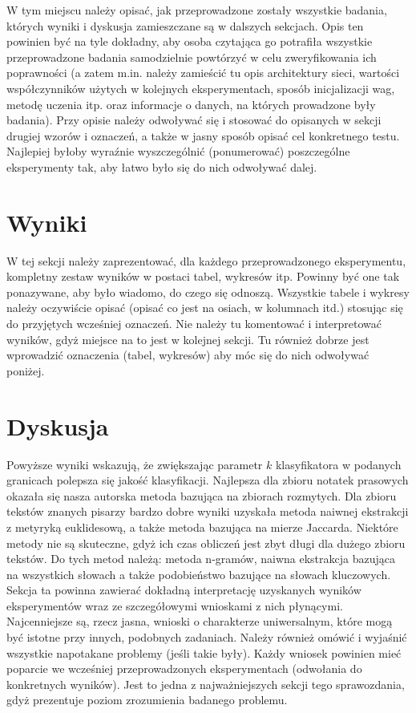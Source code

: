 \documentclass[a4paper]{classrep}
\begin{document}
{\color{blue}
W tym miejscu należy opisać, jak przeprowadzone zostały wszystkie badania,
których wyniki i dyskusja zamieszczane są w dalszych sekcjach. Opis ten
powinien być na tyle dokładny, aby osoba czytająca go potrafiła wszystkie
przeprowadzone badania samodzielnie powtórzyć w celu zweryfikowania ich
poprawności (a zatem m.in. należy zamieścić tu opis architektury sieci,
wartości współczynników użytych w kolejnych eksperymentach, sposób
inicjalizacji wag, metodę uczenia itp. oraz informacje o danych, na których
prowadzone były badania). Przy opisie należy odwoływać się i stosować do
opisanych w sekcji drugiej wzorów i oznaczeń, a także w jasny sposób opisać
cel konkretnego testu. Najlepiej byłoby wyraźnie wyszczególnić (ponumerować)
poszczególne eksperymenty tak, aby łatwo było się do nich odwoływać dalej.}

\section{Wyniki}
{\color{blue}
W tej sekcji należy zaprezentować, dla każdego przeprowadzonego eksperymentu,
kompletny zestaw wyników w postaci tabel, wykresów itp. Powinny być one tak
ponazywane, aby było wiadomo, do czego się odnoszą. Wszystkie tabele i wykresy
należy oczywiście opisać (opisać co jest na osiach, w kolumnach itd.) stosując
się do przyjętych wcześniej oznaczeń. Nie należy tu komentować i interpretować
wyników, gdyż miejsce na to jest w kolejnej sekcji. Tu również dobrze jest
wprowadzić oznaczenia (tabel, wykresów) aby móc się do nich odwoływać
poniżej.}



\section{Dyskusja}
Powyższe wyniki wskazują, że zwiększając parametr \(k\) klasyfikatora w podanych granicach polepsza się jakość klasyfikacji. Najlepsza dla zbioru notatek prasowych 
okazała się nasza autorska metoda bazująca na zbiorach rozmytych. Dla zbioru tekstów znanych pisarzy bardzo dobre wyniki uzyskała metoda naiwnej ekstrakcji z metyryką euklidesową,
a także metoda bazująca na mierze Jaccarda. Niektóre metody nie są skuteczne, gdyż ich czas obliczeń jest zbyt długi dla dużego zbioru tekstów. Do tych metod należą:
metoda n-gramów, naiwna ekstrakcja bazująca na wszystkich słowach a także podobieństwo bazujące na słowach kluczowych. 
{\color{blue}
Sekcja ta powinna zawierać dokładną interpretację uzyskanych wyników
eksperymentów wraz ze szczegółowymi wnioskami z nich płynącymi. Najcenniejsze
są, rzecz jasna, wnioski o charakterze uniwersalnym, które mogą być istotne
przy innych, podobnych zadaniach. Należy również omówić i wyjaśnić wszystkie
napotakane problemy (jeśli takie były). Każdy wniosek powinien mieć poparcie
we wcześniej przeprowadzonych eksperymentach (odwołania do konkretnych
wyników). Jest to jedna z najważniejszych sekcji tego sprawozdania, gdyż
prezentuje poziom zrozumienia badanego problemu.}
\end{document}
